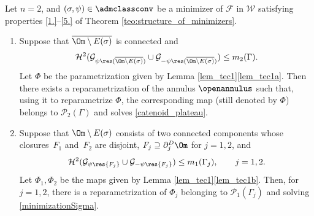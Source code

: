 \begin{lemma}\label{lem_tec2}
Let $n=2$, and $(\sigma,\psi)\in\admclassconv$ be a minimizer of
$\mathcal F$ in
$\mathcal W$
satisfying properties \ref{1.}--\ref{5.} of Theorem \ref{teo:structure_of_minimizers}.
\begin{enumerate}[{\rm(a)},wide]
\item\label{lem_tec2a}
Suppose that $\overline{\Om\setminus E(\sigma)}$ is connected and
\begin{equation}\label{eq:lem_tec2}
\mathcal H^2(\mathcal G_{\psi\res (\overline{\Om\setminus E(\sigma)})}\cup\mathcal G_{-\psi\res (\overline{\Om\setminus E(\sigma)})})\leq m_2(\Gamma).
\end{equation}
Let $\Phi$ be the parametrization given by Lemma \ref{lem_tec1}\ref{lem_tec1a}.
Then there exists a reparametrization of the annulus $\openannulus$
such that, using it to reparametrize $\Phi$, the corresponding map (still denoted by $\Phi$)
belongs to $\mathcal P_2(\Gamma)$ and solves \eqref{catenoid_plateau}.
\item\label{lem_tec2b}
Suppose that $\Om\setminus E(\sigma)$
consists of two connected components whose closures~$F_1$ and~$F_2$ are disjoint,
$F_j \supseteq \partial_j^D \Om$ for $j=1,2$, and
\[
\mathcal H^2(\mathcal G_{\psi\res {F_j}}
\cup\mathcal G_{-\psi\res {F_j}})\leq m_1(\Gamma_j),
\qquad j=1,2.
\]
Let $\Phi_1,\Phi_2$ be the maps given by Lemma \ref{lem_tec1}\ref{lem_tec1b}. Then, for $j=1,2$, there is a reparametrization
of $\Phi_j$ belonging to $\mathcal P_1(\Gamma_j)$ and solving \eqref{minimizationSigma}.
\end{enumerate}
\end{lemma}

